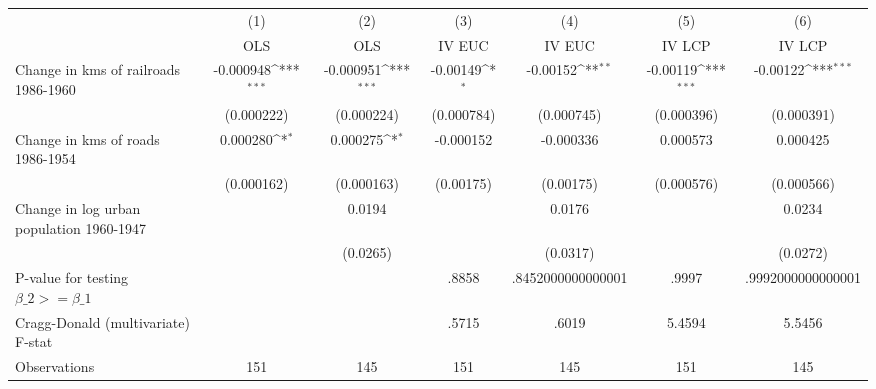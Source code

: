 {
\def\sym#1{\ifmmode^{#1}\else\(^{#1}\)\fi}
\begin{tabular}{l*{6}{c}}
\hline\hline
                &\multicolumn{1}{c}{(1)}&\multicolumn{1}{c}{(2)}&\multicolumn{1}{c}{(3)}&\multicolumn{1}{c}{(4)}&\multicolumn{1}{c}{(5)}&\multicolumn{1}{c}{(6)}\\
                &\multicolumn{1}{c}{OLS}&\multicolumn{1}{c}{OLS}&\multicolumn{1}{c}{IV EUC}&\multicolumn{1}{c}{IV EUC}&\multicolumn{1}{c}{IV LCP}&\multicolumn{1}{c}{IV LCP}\\
\hline
Change in kms of railroads 1986-1960&-0.000948\sym{***}&-0.000951\sym{***}& -0.00149\sym{*}  & -0.00152\sym{**} & -0.00119\sym{***}& -0.00122\sym{***}\\
                &(0.000222)         &(0.000224)         &(0.000784)         &(0.000745)         &(0.000396)         &(0.000391)         \\
[1em]
Change in kms of roads 1986-1954& 0.000280\sym{*}  & 0.000275\sym{*}  &-0.000152         &-0.000336         & 0.000573         & 0.000425         \\
                &(0.000162)         &(0.000163)         &(0.00175)         &(0.00175)         &(0.000576)         &(0.000566)         \\
[1em]
Change in log urban population 1960-1947&                  &   0.0194         &                  &   0.0176         &                  &   0.0234         \\
                &                  & (0.0265)         &                  & (0.0317)         &                  & (0.0272)         \\
\hline
P-value for testing $\beta\_{2} >= \beta\_{1}$&                  &                  &    .8858         &.8452000000000001         &    .9997         &.9992000000000001         \\
Cragg-Donald (multivariate) F-stat&                  &                  &    .5715         &    .6019         &   5.4594         &   5.5456         \\
Observations    &      151         &      145         &      151         &      145         &      151         &      145         \\
\hline\hline
\end{tabular}
}
